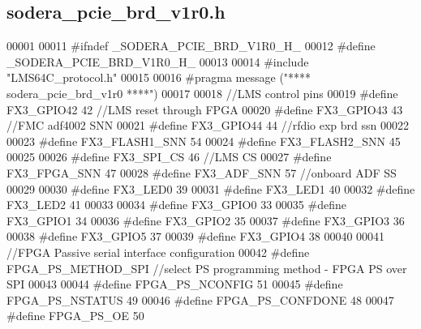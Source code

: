 \subsection{sodera\+\_\+pcie\+\_\+brd\+\_\+v1r0.\+h}
\label{sodera__pcie__brd__v1r0_8h_source}

\begin{DoxyCode}
00001 
00011 \textcolor{preprocessor}{#ifndef \_SODERA\_PCIE\_BRD\_V1R0\_H\_}
00012 \textcolor{preprocessor}{#define \_SODERA\_PCIE\_BRD\_V1R0\_H\_}
00013 
00014 \textcolor{preprocessor}{#include "LMS64C_protocol.h"}
00015 
00016 \textcolor{preprocessor}{#pragma message ("**** sodera\_pcie\_brd\_v1r0 ****")}
00017 
00018 \textcolor{comment}{//LMS control pins}
00019 \textcolor{preprocessor}{#define FX3\_GPIO42          42 //LMS reset through FPGA}
00020 \textcolor{preprocessor}{#define FX3\_GPIO43          43 //FMC adf4002 SNN}
00021 \textcolor{preprocessor}{#define FX3\_GPIO44          44 //rfdio exp brd ssn}
00022 
00023 \textcolor{preprocessor}{#define FX3\_FLASH1\_SNN      54}
00024 \textcolor{preprocessor}{#define FX3\_FLASH2\_SNN      45}
00025 
00026 \textcolor{preprocessor}{#define FX3\_SPI\_CS          46 //LMS CS}
00027 \textcolor{preprocessor}{#define FX3\_FPGA\_SNN        47}
00028 \textcolor{preprocessor}{#define FX3\_ADF\_SNN         57 //onboard ADF SS}
00029 
00030 \textcolor{preprocessor}{#define FX3\_LED0            39}
00031 \textcolor{preprocessor}{#define FX3\_LED1            40}
00032 \textcolor{preprocessor}{#define FX3\_LED2            41}
00033 
00034 \textcolor{preprocessor}{#define FX3\_GPIO0           33}
00035 \textcolor{preprocessor}{#define FX3\_GPIO1           34}
00036 \textcolor{preprocessor}{#define FX3\_GPIO2           35}
00037 \textcolor{preprocessor}{#define FX3\_GPIO3           36}
00038 \textcolor{preprocessor}{#define FX3\_GPIO5           37}
00039 \textcolor{preprocessor}{#define FX3\_GPIO4           38}
00040 
00041 \textcolor{comment}{//FPGA Passive serial interface configuration}
00042 \textcolor{preprocessor}{#define FPGA\_PS\_METHOD\_SPI //select PS programming method - FPGA PS over SPI}
00043 
00044 \textcolor{preprocessor}{#define FPGA\_PS\_NCONFIG     51}
00045 \textcolor{preprocessor}{#define FPGA\_PS\_NSTATUS     49}
00046 \textcolor{preprocessor}{#define FPGA\_PS\_CONFDONE    48}
00047 \textcolor{preprocessor}{#define FPGA\_PS\_OE          50}

\end{DoxyCode}
